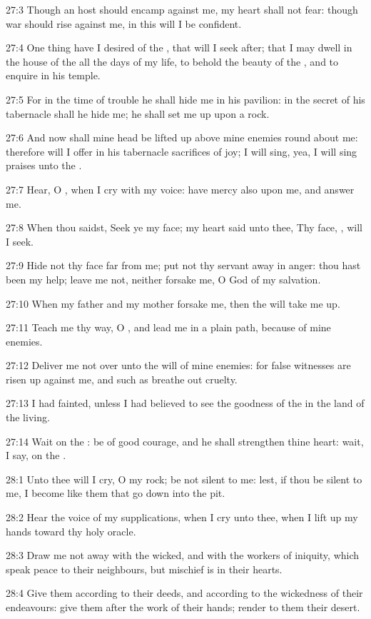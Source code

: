 27:3 Though an host should encamp against me, my heart shall not fear: though war should rise against me, in this will I be confident.

27:4 One thing have I desired of the \LORD, that will I seek after; that I may dwell in the house of the \LORD all the days of my life, to behold the beauty of the \LORD, and to enquire in his temple.

27:5 For in the time of trouble he shall hide me in his pavilion: in the secret of his tabernacle shall he hide me; he shall set me up upon a rock.

27:6 And now shall mine head be lifted up above mine enemies round about me: therefore will I offer in his tabernacle sacrifices of joy; I will sing, yea, I will sing praises unto the \LORD.

27:7 Hear, O \LORD, when I cry with my voice: have mercy also upon me, and answer me.

27:8 When thou saidst, Seek ye my face; my heart said unto thee, Thy face, \LORD, will I seek.

27:9 Hide not thy face far from me; put not thy servant away in anger: thou hast been my help; leave me not, neither forsake me, O God of my salvation.

27:10 When my father and my mother forsake me, then the \LORD will take me up.

27:11 Teach me thy way, O \LORD, and lead me in a plain path, because of mine enemies.

27:12 Deliver me not over unto the will of mine enemies: for false witnesses are risen up against me, and such as breathe out cruelty.

27:13 I had fainted, unless I had believed to see the goodness of the \LORD in the land of the living.

27:14 Wait on the \LORD: be of good courage, and he shall strengthen thine heart: wait, I say, on the \LORD.



28:1 Unto thee will I cry, O \LORD my rock; be not silent to me: lest, if thou be silent to me, I become like them that go down into the pit.

28:2 Hear the voice of my supplications, when I cry unto thee, when I lift up my hands toward thy holy oracle.

28:3 Draw me not away with the wicked, and with the workers of iniquity, which speak peace to their neighbours, but mischief is in their hearts.

28:4 Give them according to their deeds, and according to the wickedness of their endeavours: give them after the work of their hands; render to them their desert.

